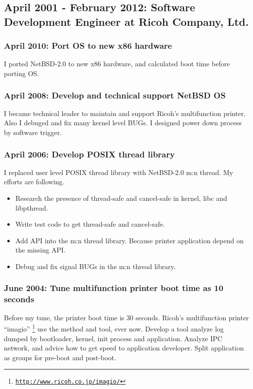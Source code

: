 \documentclass[letterpaper]{article}
\begin{document}
\subsection*{April 2001 - February 2012: Software Development Engineer at Ricoh Company, Ltd.}
\subsubsection*{April 2010: Port OS to new x86 hardware}
I ported NetBSD-2.0 to new x86 hardware, and calculated boot time before porting OS.

\subsubsection*{April 2008: Develop and technical support NetBSD OS}
I became technical leader to maintain and support Ricoh's multifunction printer.
Also I debuged and fix many kernel level BUGs.
I designed power down process by software trigger.

\subsubsection*{April 2006: Develop POSIX thread library}
I replaced user level POSIX thread library with NetBSD-2.0 m:n thread.
My efforts are following.
\begin{itemize}
  \item Research the presence of thread-safe and cancel-safe in kernel, libc and libpthread.
  \item Write test code to get thread-safe and cancel-safe.
  \item Add API into the m:n thread library. Because printer application depend on the missing API.
  \item Debug and fix signal BUGs in the m:n thread library.
\end{itemize}

\subsubsection*{June 2004: Tune multifunction printer boot time as 10 seconds}
Before my tune, the printer boot time is 30 seconds.
Ricoh's multifunction printer ``imagio''
\footnote{\href{http://www.ricoh.co.jp/imagio/}{\tt http://www.ricoh.co.jp/imagio/}}
use the method and tool, ever now.
Develop a tool analyze log dumped by bootloader, kernel, init process and application.
Analyze IPC network, and advice how to get speed to application developer.
Split application as groups for pre-boot and post-boot.
\end{document}
